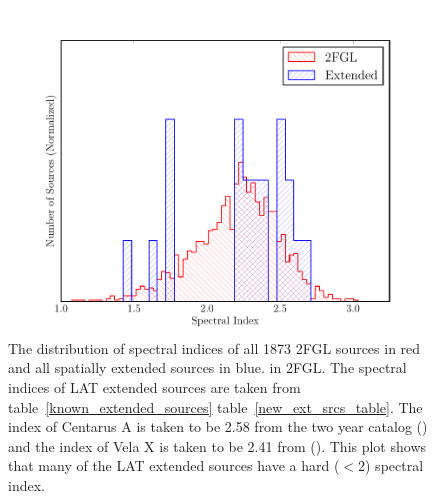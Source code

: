 \documentclass[12pt,preprint]{aastex}
\begin{document}
\clearpage
\begin{figure}
  \begin{center}
    \includegraphics{summary_plots/compare_index_2FGL.pdf}
    \end{center}
    \caption{
    The distribution of spectral indices of all 1873 2FGL sources in
    red and all spatially extended sources in blue.  in 2FGL. The
    spectral indices of LAT extended sources are taken from
    table~\ref{known_extended_sources} table~\ref{new_ext_srcs_table}.
    The index of Centarus A is taken to be 2.58 from the two year catalog
    (\cite{second_cat}) and the index of Vela X is taken to be 2.41
    from (\cite{velax}). This plot shows that many of the LAT
    extended sources have a hard ($<2$) spectral index.
    }\label{compare_index_2FGL}
  \end{figure}
\end{document}
